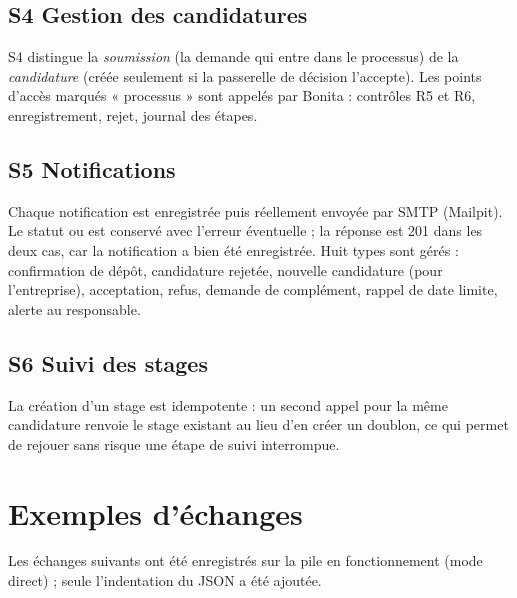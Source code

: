 \subsection{S4 Gestion des candidatures}
S4 distingue la \emph{soumission} (la demande qui entre dans le processus) de la \emph{candidature} (créée seulement si la passerelle de décision l'accepte). Les points d'accès marqués « processus » sont appelés par Bonita : contrôles R5 et R6, enregistrement, rejet, journal des étapes.
{\small}

\subsection{S5 Notifications}
Chaque notification est enregistrée puis réellement envoyée par SMTP (Mailpit). Le statut  ou  est conservé avec l'erreur éventuelle ; la réponse est 201 dans les deux cas, car la notification a bien été enregistrée. Huit types sont gérés : confirmation de dépôt, candidature rejetée, nouvelle candidature (pour l'entreprise), acceptation, refus, demande de complément, rappel de date limite, alerte au responsable.
{\small}

\subsection{S6 Suivi des stages}
La création d'un stage est idempotente : un second appel pour la même candidature renvoie le stage existant au lieu d'en créer un doublon, ce qui permet de rejouer sans risque une étape de suivi interrompue.
{\small}

\section{Exemples d'échanges}

Les échanges suivants ont été enregistrés sur la pile en fonctionnement (mode direct) ; seule l'indentation du JSON a été ajoutée.





